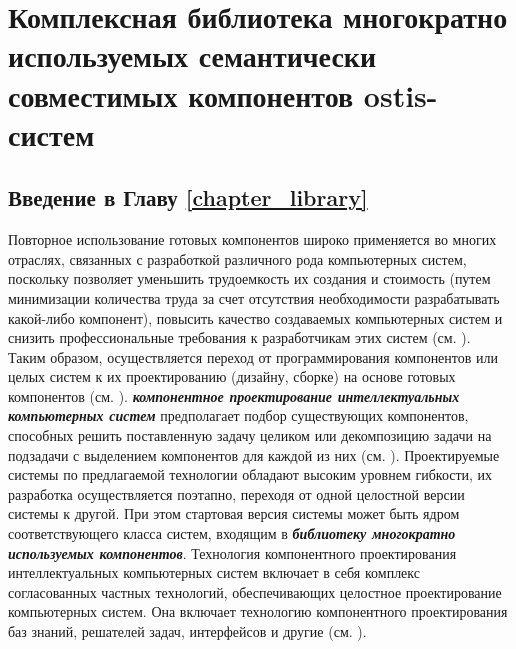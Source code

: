 \chapter{Комплексная библиотека многократно используемых семантически совместимых компонентов ostis-систем}
\label{chapter_library}

\vspace{-7\baselineskip}


\section*{Введение в Главу \ref{chapter_library}}
\label{ostis_library_introduction}

Повторное использование готовых компонентов широко применяется во многих отраслях, связанных с разработкой различного рода компьютерных систем, поскольку позволяет уменьшить трудоемкость их создания и стоимость (путем минимизации количества труда за счет отсутствия необходимости разрабатывать какой-либо компонент), повысить качество создаваемых компьютерных систем и снизить профессиональные требования к разработчикам этих систем (см. ). Таким образом, осуществляется переход от программирования компонентов или целых систем к их проектированию (дизайну, сборке) на основе готовых компонентов (см. ). \textbf{\textit{компонентное проектирование интеллектуальных компьютерных систем}} предполагает подбор существующих компонентов, способных решить поставленную задачу целиком или декомпозицию задачи на подзадачи с выделением компонентов для каждой из них (см. ). Проектируемые системы по предлагаемой технологии обладают высоким уровнем гибкости, их разработка осуществляется поэтапно, переходя от одной целостной версии системы к другой. При этом стартовая версия системы может быть ядром соответствующего класса систем, входящим в \textbf{\textit{библиотеку многократно используемых компонентов}}. Технология компонентного проектирования интеллектуальных компьютерных систем включает в себя комплекс согласованных частных технологий, обеспечивающих целостное проектирование компьютерных систем. Она включает технологию компонентного проектирования баз знаний, решателей задач, интерфейсов и другие (см. ). 

